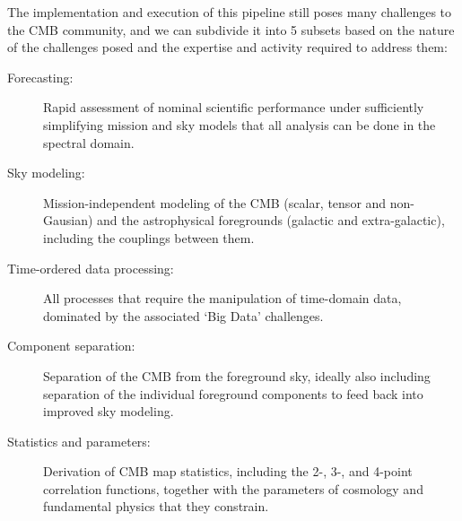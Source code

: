 The implementation and execution of this pipeline still poses many challenges to the CMB community, and we can subdivide it into 5 subsets based on the nature of the challenges posed and the expertise and activity required to address them:
\vspace*{-0.1in}
\begin{description}
\item[Forecasting:] Rapid assessment of nominal scientific performance under sufficiently simplifying mission and sky models that all analysis can be done in the spectral domain.
\item[Sky modeling:] Mission-independent modeling of the CMB (scalar, tensor and non-Gausian) and the astrophysical foregrounds (galactic and extra-galactic), including the couplings between them.
\item[Time-ordered data processing:] All processes that require the manipulation of time-domain data, dominated by the associated `Big Data' challenges.
\item[Component separation:] Separation of the CMB from the foreground sky, ideally also including separation of the individual foreground components to feed back into improved sky modeling.
\item[Statistics and parameters:] Derivation of CMB map statistics, including the 2-, 3-, and 4-point correlation functions, together with the parameters of cosmology and fundamental physics that they constrain.
\end{description}

\newpage



\newpage



\newpage



\newpage



\newpage



\newpage

%



